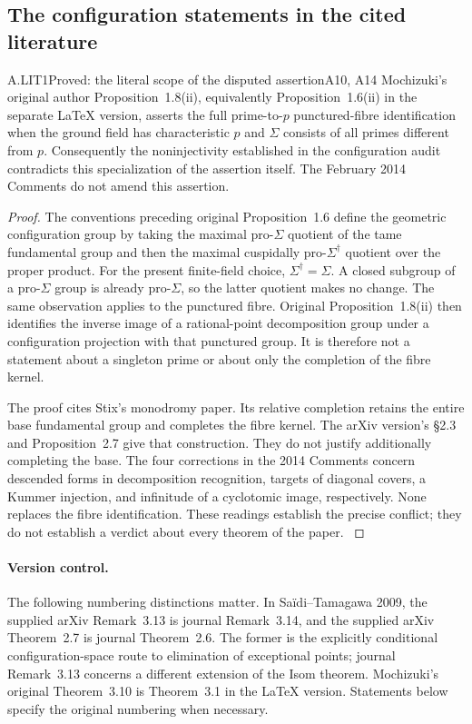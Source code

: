 \subsection{The configuration statements in the cited literature}

\begin{claim}{A.LIT1}{Proved: the literal scope of the disputed assertion}{A10, A14}
Mochizuki's original author Proposition~1.8(ii), equivalently
Proposition~1.6(ii) in the separate LaTeX version, asserts the full
prime-to-$p$ punctured-fibre identification when the ground field has
characteristic $p$ and $\Sigma$ consists of all primes different from $p$.
Consequently the noninjectivity established in the configuration audit
contradicts this specialization of the assertion itself. The February
2014 Comments do not amend this assertion.
\end{claim}
\begin{proof}
The conventions preceding original Proposition~1.6 define the geometric
configuration group by taking the maximal pro-$\Sigma$ quotient of the
tame fundamental group and then the maximal cuspidally pro-$\Sigma^\dagger$
quotient over the proper product. For the present finite-field choice,
$\Sigma^\dagger=\Sigma$. A closed subgroup of a pro-$\Sigma$ group is
already pro-$\Sigma$, so the latter quotient makes no change. The same
observation applies to the punctured fibre. Original Proposition~1.8(ii)
then identifies the inverse image of a rational-point decomposition
group under a configuration projection with that punctured group.
It is therefore not a statement about a singleton prime or about only
the completion of the fibre kernel.

The proof cites Stix's monodromy paper. Its relative completion retains
the entire base fundamental group and completes the fibre kernel.
The arXiv version's \S2.3 and Proposition~2.7 give that construction.
They do not justify additionally completing the base. The four corrections
in the 2014 Comments concern descended forms in decomposition recognition,
targets of diagonal covers, a Kummer injection, and infinitude of a
cyclotomic image, respectively. None replaces the fibre identification.
These readings establish the precise conflict; they do not establish a
verdict about every theorem of the paper.
\citep[original pp.~11,14--15]{LA_Mochizuki2007}
\citep{LA_Mochizuki2014,LA_Stix2005}
\end{proof}

\paragraph{Version control.}
The following numbering distinctions matter. In Sa\"idi--Tamagawa 2009,
the supplied arXiv Remark~3.13 is journal Remark~3.14, and the supplied
arXiv Theorem~2.7 is journal Theorem~2.6. The former is the explicitly
conditional configuration-space route to elimination of exceptional
points; journal Remark~3.13 concerns a different extension of the Isom
theorem. Mochizuki's original Theorem~3.10 is Theorem~3.1 in the LaTeX
version. Statements below specify the original numbering when necessary.
\citep{LA_ST2009,LA_Mochizuki2007}

